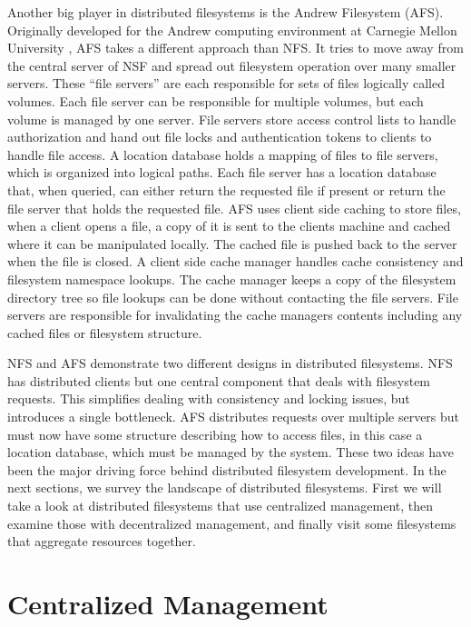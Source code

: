 Another big player in distributed filesystems is the Andrew Filesystem (AFS). Originally developed for the Andrew computing environment at Carnegie Mellon University \cite{Howard1988,Howard1988a,Howard1985}, AFS takes a different approach than NFS. It tries to move away from the central server of NSF and spread out filesystem operation over many smaller servers. These ``file servers'' are each responsible for sets of files logically called volumes. Each file server can be responsible for multiple volumes, but each volume is managed by one server. File servers store access control lists to handle authorization and hand out file locks and authentication tokens to clients to handle file access. A location database holds a mapping of files to file servers, which is organized into logical paths. Each file server has a location database that, when queried, can either return the requested file if present or return the file server that holds the requested file. AFS uses client side caching to store files, when a client opens a file, a copy of it is sent to the clients machine and cached where it can be manipulated locally. The cached file is pushed back to the server when the file is closed. A client side cache manager handles cache consistency and filesystem namespace lookups. The cache manager keeps a copy of the filesystem directory tree so file lookups can be done without contacting the file servers. File servers are responsible for invalidating the cache managers contents including any cached files or filesystem structure. 

NFS and AFS demonstrate two different designs in distributed filesystems. NFS has distributed clients but one central component that deals with filesystem requests. This simplifies dealing with consistency and locking issues, but introduces a single bottleneck. AFS distributes requests over multiple servers but must now have some structure describing how to access files, in this case a location database, which must be managed by the system. These two ideas have been the major driving force behind distributed filesystem development. In the next sections, we survey the landscape of distributed filesystems. First we will take a look at distributed filesystems that use centralized management, then examine those with decentralized management, and finally visit some filesystems that aggregate resources together.


\section{Centralized Management}

